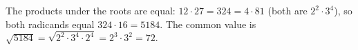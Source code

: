 The products under the roots are equal: $12\cdot27=324=4\cdot81$ (both are $2^2\cdot3^4$), so both radicands equal $324\cdot16=5184$. The common value is $\sqrt{5184}=\sqrt{2^2\cdot3^4\cdot2^4}=2^3\cdot3^2=\boxed{72}$.
